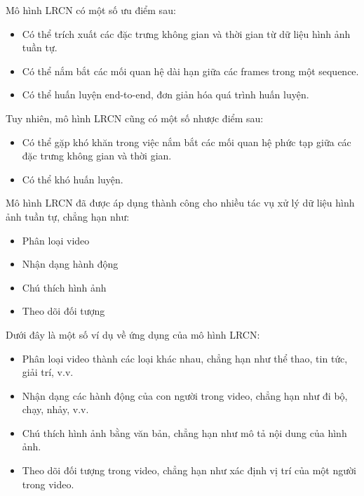 Mô hình LRCN có một số ưu điểm sau:
\begin{itemize}
    \item Có thể trích xuất các đặc trưng không gian và thời gian từ dữ liệu hình ảnh tuần tự.
    \item Có thể nắm bắt các mối quan hệ dài hạn giữa các frames trong một sequence.
    \item Có thể huấn luyện end-to-end, đơn giản hóa quá trình huấn luyện.
\end{itemize}

Tuy nhiên, mô hình LRCN cũng có một số nhược điểm sau:
\begin{itemize}
    \item Có thể gặp khó khăn trong việc nắm bắt các mối quan hệ phức tạp giữa các đặc trưng không gian và thời gian.
    \item Có thể khó huấn luyện.

\end{itemize}

Mô hình LRCN đã được áp dụng thành công cho nhiều tác vụ xử lý dữ liệu hình ảnh tuần tự, chẳng hạn như:
\begin{itemize}
    \item Phân loại video
    \item Nhận dạng hành động
    \item Chú thích hình ảnh
    \item Theo dõi đối tượng
\end{itemize}

Dưới đây là một số ví dụ về ứng dụng của mô hình LRCN:
\begin{itemize}
    \item Phân loại video thành các loại khác nhau, chẳng hạn như thể thao, tin tức, giải trí, v.v.
    \item Nhận dạng các hành động của con người trong video, chẳng hạn như đi bộ, chạy, nhảy, v.v.
    \item Chú thích hình ảnh bằng văn bản, chẳng hạn như mô tả nội dung của hình ảnh.
    \item Theo dõi đối tượng trong video, chẳng hạn như xác định vị trí của một người trong video.
\end{itemize}




